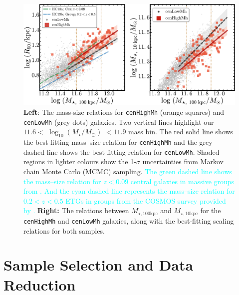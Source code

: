 \documentclass[a4paper,fleqn,usenatbib]{mnras}
\def\rbcg{\texttt{cenHighMh}}
\def\nbcg{\texttt{cenLowMh}}
\def\logms{{$\log_{10} (M_{\star}/M_{\odot})$}}
\def\minn{{$M_{\star,10\mathrm{kpc}}$}}
\def\mtot{{$M_{\star,100\mathrm{kpc}}$}}
\newcommand{\song}[1]{\textcolor{cyan}{#1}}
\begin{document}
  \begin{figure}
      \centering 
      \includegraphics[width=\textwidth]{fig/redbcg_scaling_relation}
      \caption{
          \textbf{Left}: The mass-size relations for \rbcg{} (orange squares) and 
          \nbcg{} (grey dots) galaxies. 
          Two vertical lines highlight our $11.6<$ \logms{} $<11.9$ mass bin. 
          The red solid line shows the best-fitting mass--size relation for \rbcg{} and the 
          grey dashed line shows the best-fitting relation for \nbcg{}. 
          Shaded regions in lighter colours show the 1-$\sigma$ uncertainties
          from Markov chain Monte Carlo (MCMC) sampling.  
          \song{
          The green dashed line shows the mass--size relation for $z<0.09$ central 
          galaxies in massive groups from \citet{HCompany13}. 
          And the cyan dashed line represents the mass--size relation for 
          $0.2<z<0.5$ ETGs in groups from the COSMOS survey provided by 
          \citet{HueartasCompany2013b}.
          }
          \textbf{Right:} The relations between \mtot{} and \minn{} for the 
          \rbcg{} and \nbcg{} galaxies, along with the best-fitting scaling relations for 
          both samples.
          }
      \label{fig:scaling_relation} 
  \end{figure}

\section{Sample Selection and Data Reduction}
    \label{sec:data}
    
\end{document}
